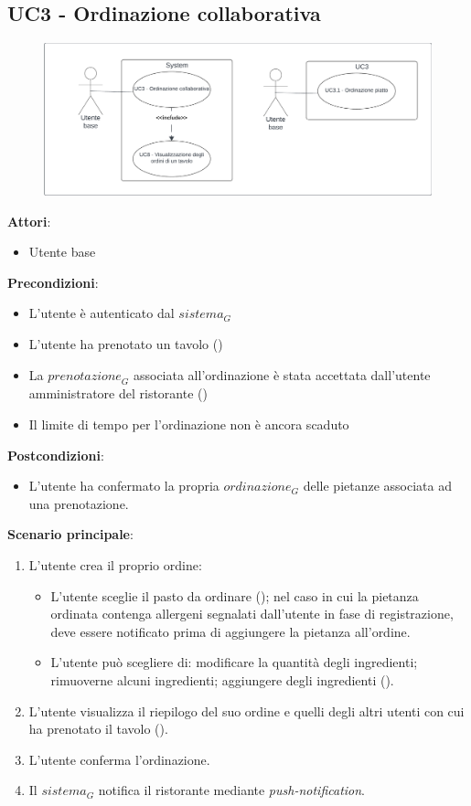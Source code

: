 \subsection{UC3 - Ordinazione collaborativa}\label{usecase:3}

\begin{figure}[H]
    \centering
    \includegraphics[width=0.9\linewidth]{ucd/UCD3_nuovo.png}
\end{figure}

\textbf{Attori}:
\begin{itemize}
    \item Utente base
\end{itemize}
\textbf{Precondizioni}:
\begin{itemize}
    \item L'utente è autenticato dal $\textit{sistema}_G$ 
    \item L'utente ha prenotato un tavolo ()
    \item La $\textit{prenotazione}_G$ associata all'ordinazione è stata accettata dall'utente amministratore del ristorante ()
    \item Il limite di tempo per l'ordinazione non è ancora scaduto
\end{itemize}
\textbf{Postcondizioni}:
\begin{itemize}
    \item L'utente ha confermato la propria $\textit{ordinazione}_G$ delle pietanze associata ad una prenotazione.
\end{itemize}
\textbf{Scenario principale}:
\begin{enumerate}
    \item L'utente crea il proprio ordine:
    \begin{itemize}
    \item L'utente sceglie il pasto da ordinare (); nel caso in cui la pietanza ordinata contenga allergeni segnalati dall'utente in fase di registrazione, deve essere notificato prima di  aggiungere la pietanza all'ordine.
    \item L'utente può scegliere di: modificare la quantità degli ingredienti; rimuoverne alcuni ingredienti; aggiungere degli ingredienti ().
    \end{itemize}
    \item L'utente visualizza il riepilogo del suo ordine e quelli degli altri utenti con cui ha prenotato il tavolo ().
    \item L'utente conferma l'ordinazione.
    \item Il $\textit{sistema}_G$ notifica il ristorante mediante \textit{push-notification}.
\end{enumerate}


